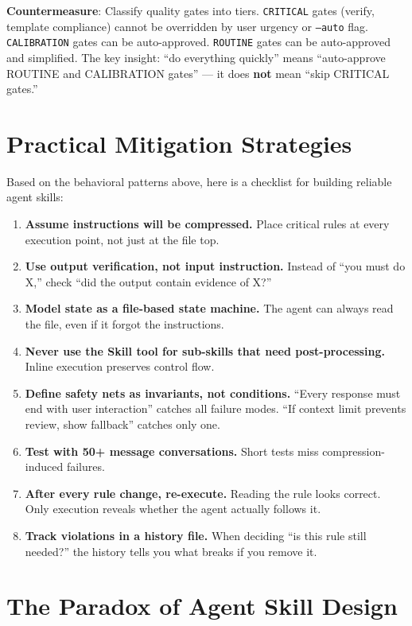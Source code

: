 \documentclass[11pt,a4paper,openright,twoside]{report}
\begin{document}
\textbf{Countermeasure}: Classify quality gates into tiers. \texttt{CRITICAL} gates (verify, template compliance) cannot be overridden by user urgency or \texttt{--auto} flag. \texttt{CALIBRATION} gates can be auto-approved. \texttt{ROUTINE} gates can be auto-approved and simplified. The key insight: ``do everything quickly'' means ``auto-approve ROUTINE and CALIBRATION gates'' --- it does \textbf{not} mean ``skip CRITICAL gates.''

\section{Practical Mitigation Strategies}

Based on the behavioral patterns above, here is a checklist for building reliable agent skills:

\begin{enumerate}
  \item \textbf{Assume instructions will be compressed.} Place critical rules at every execution point, not just at the file top.
  \item \textbf{Use output verification, not input instruction.} Instead of ``you must do X,'' check ``did the output contain evidence of X?''
  \item \textbf{Model state as a file-based state machine.} The agent can always read the file, even if it forgot the instructions.
  \item \textbf{Never use the Skill tool for sub-skills that need post-processing.} Inline execution preserves control flow.
  \item \textbf{Define safety nets as invariants, not conditions.} ``Every response must end with user interaction'' catches all failure modes. ``If context limit prevents review, show fallback'' catches only one.
  \item \textbf{Test with 50+ message conversations.} Short tests miss compression-induced failures.
  \item \textbf{After every rule change, re-execute.} Reading the rule looks correct. Only execution reveals whether the agent actually follows it.
  \item \textbf{Track violations in a history file.} When deciding ``is this rule still needed?'' the history tells you what breaks if you remove it.
\end{enumerate}

\section{The Paradox of Agent Skill Design}
\end{document}
